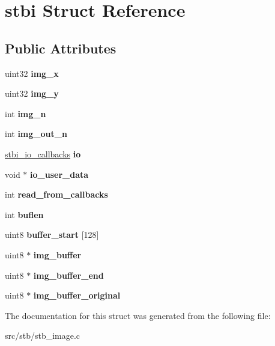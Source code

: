 \hypertarget{structstbi}{}\section{stbi Struct Reference}
\label{structstbi}
\subsection*{Public Attributes}
\begin{DoxyCompactItemize}
\item 
\mbox{\label{structstbi_af3b42c257fb0d8896f29ca3921540a42}} 
uint32 {\bfseries img\+\_\+x}
\item 
\mbox{\label{structstbi_a60cb5a630e268b2d12306c6eca246dd1}} 
uint32 {\bfseries img\+\_\+y}
\item 
\mbox{\label{structstbi_ae22cfcc23f5ab67bede22942333ecbd7}} 
int {\bfseries img\+\_\+n}
\item 
\mbox{\label{structstbi_a33f6519d8f99b84afbde795dc7a931f2}} 
int {\bfseries img\+\_\+out\+\_\+n}
\item 
\mbox{\label{structstbi_a86596e1eb2b0f57a60a18777bd37ff53}} 
\hyperlink{structstbi__io__callbacks}{stbi\+\_\+io\+\_\+callbacks} {\bfseries io}
\item 
\mbox{\label{structstbi_a9838a0c89630f283c25a16f4e30f40aa}} 
void $\ast$ {\bfseries io\+\_\+user\+\_\+data}
\item 
\mbox{\label{structstbi_acb201cc1b3eb134f342cee89f5d11e70}} 
int {\bfseries read\+\_\+from\+\_\+callbacks}
\item 
\mbox{\label{structstbi_a76d6f761529ecff7f02469b19371af0e}} 
int {\bfseries buflen}
\item 
\mbox{\label{structstbi_af99edda496281a6ca1b58271cabdbc69}} 
uint8 {\bfseries buffer\+\_\+start} \mbox{[}128\mbox{]}
\item 
\mbox{\label{structstbi_aace36d5487a596bea5faa0aef0398ac8}} 
uint8 $\ast$ {\bfseries img\+\_\+buffer}
\item 
\mbox{\label{structstbi_a55f78565e605f1784d47fc9acea475f3}} 
uint8 $\ast$ {\bfseries img\+\_\+buffer\+\_\+end}
\item 
\mbox{\label{structstbi_a261be6edda817862e623972b21b4f965}} 
uint8 $\ast$ {\bfseries img\+\_\+buffer\+\_\+original}
\end{DoxyCompactItemize}


The documentation for this struct was generated from the following file\+:\begin{DoxyCompactItemize}
\item 
src/stb/stb\+\_\+image.\+c\end{DoxyCompactItemize}
